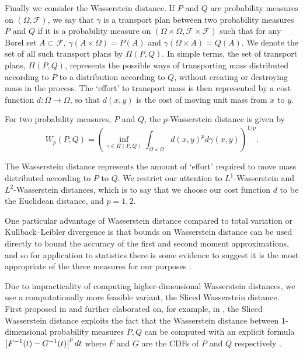 Finally we consider the Wasserstein distance.  If $P$ and $Q$ are probability measures on $(\Omega, \mathcal{F})$, we say that $\gamma$ is a transport plan between two probability measures $P$ and $Q$ if it is a probability measure on $(\Omega \times \Omega, \mathcal{F} \times \mathcal{F})$ such that for any Borel set $A \subset \mathcal{F}$, $\gamma(A \times \Omega)=P(A)$ and $\gamma(\Omega \times A) = Q(A)$.  We denote the set of all such transport plans by $\Pi(P,Q)$.  In simple terms, the set of transport plans, $\Pi(P,Q)$, represents the possible ways of transporting mass distributed according to $P$ to a distribution according to $Q$, without creating or destroying mass in the process.  The `effort' to transport mass is then represented by a cost function $d:\Omega \to \Omega$, so that $d(x,y)$ is the cost of moving unit mass from $x$ to $y$.

\begin{defn}
For two probability measures, $P$ and $Q$, the $p$-Wasserstein distance is given by
$$
W_p(P,Q) = \left( \inf_{\gamma \in \Pi(P,Q)} \int_{\Omega \times \Omega} d(x,y)^p d \gamma(x,y) \right)^{1/p}.
$$
\end{defn}

The Wasserstein distance represents the amount of `effort' required to move mass distributed according to $P$ to $Q$.  We restrict our attention to $L^1$-Wasserstein and $L^2$-Wasserstein distances, which is to say that we choose our cost function $d$ to be the Euclidean distance, and $p=1,2$.

One particular advantage of Wasserstein distance compared to total variation or Kullback--Leibler divergence is that bounds on Wasserstein distance can be used directly to bound the accuracy of the first and second moment approximations, and so for application to statistics there is some evidence to suggest it is the most appropriate of the three measures for our purposes \cite{dalalyan2019user}.

Due to impracticality of computing higher-dimensional Wasserstein distances, we use a computationally more feasible variant, the Sliced Wasserstein distance. First proposed in \cite{rabin2011wasserstein} and further elaborated on, for example, in \cite{gswd}, the Sliced Wasserstein distance exploits the fact that the Wasserstein distance between 1-dimensional probability measures $P, Q$ can be computed with an explicit formula $\abs{F^{-1}(t)-G^{-1}(t)}^p dt$ where $F$ and $G$ are the CDFs of $P$ and $Q$ respectively \cite{ramdas2017wasserstein}.


